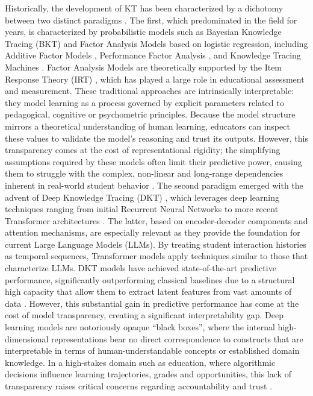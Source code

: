 \documentclass[applsci,article,submit,moreauthors,pdftex]{Definitions/mdpi}
\begin{document}
{Historically, the development of KT has been characterized by a dichotomy between two distinct paradigms \citep{abdelrahman2023knowledge}. The first, which predominated in the field for years, is characterized by probabilistic models such as Bayesian Knowledge Tracing (BKT) \citep{corbett1994knowledge} and Factor Analysis Models based on logistic regression, including Additive Factor Models \citep{cen2008comparing}, Performance Factor Analysis \citep{pavlik2009performance}, and Knowledge Tracing Machines \citep{vie2019knowledge}. Factor Analysis Models are theoretically supported by the Item Response Theory (IRT) \citep{embretson2013item}, which has played a large role in educational assessment and measurement. These traditional approaches are intrinsically interpretable: they model learning as a process governed by explicit parameters related to pedagogical, cognitive or psychometric principles. Because the model structure mirrors a theoretical understanding of human learning, educators can inspect these values to validate the model's reasoning and trust its outputs. However, this transparency comes at the cost of representational rigidity; the simplifying assumptions required by these models often limit their predictive power, causing them to struggle with the complex, non-linear and long-range dependencies inherent in real-world student behavior \citep{twenty_five_years_of_bkt}.
The second paradigm emerged with the advent of Deep Knowledge Tracing (DKT) \citep{piech2015deep}, which leverages deep learning techniques ranging from initial Recurrent Neural Networks to more recent Transformer architectures \citep{vaswani2017attention}. The latter, based on encoder-decoder components and attention mechanisms, are especially relevant as they provide the foundation for current Large Language Models (LLMs). By treating student interaction histories as temporal sequences, Transformer models apply techniques similar to those that characterize LLMs. DKT models have achieved state-of-the-art predictive performance, significantly outperforming classical baselines due to a structural high capacity that allow them to extract latent features from vast amounts of data \citep{abdelrahman2023knowledge}. However, this substantial gain in predictive performance has come at the cost of model transparency, creating a significant interpretability gap. Deep learning models are notoriously opaque ``black boxes'', where the internal high-dimensional representations bear no direct correspondence to constructs that are interpretable in terms of human-understandable concepts or established domain knowledge. In a high-stakes domain such as education, where algorithmic decisions influence learning trajectories, grades and opportunities, this lack of transparency raises critical concerns regarding accountability and trust \citep{Holmes2022504}.
}
\end{document}
